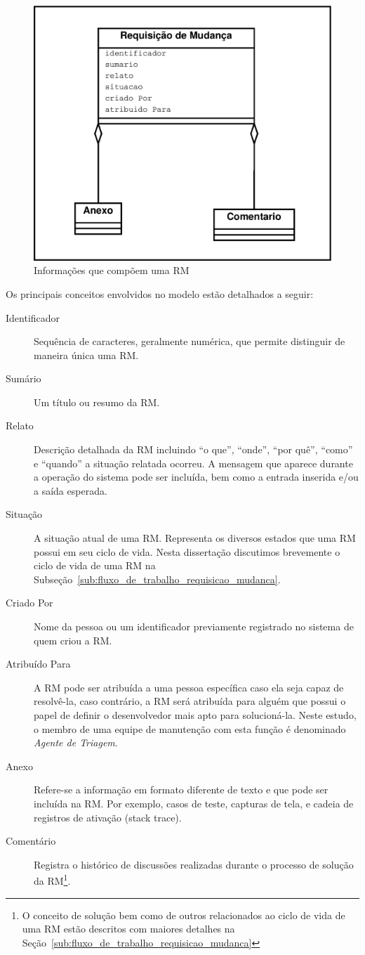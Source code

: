 \begin{figure}[htpb]
	\centering
	\includegraphics[width=0.5\linewidth]{./chapter-manutencao-software-visao-geral/img/diagrama-classe-atributos-requisicao-mudancas.pdf}
	\caption{Informações que compõem uma RM}
\label{fig:diagrama-classe-atributos-requisicao-mudancas}
\end{figure}

Os principais conceitos envolvidos no modelo estão detalhados a seguir:

\begin{description}
    \item [Identificador] Sequência de caracteres, geralmente numérica,  que
        permite distinguir de maneira única uma RM\@.
	\item [Sumário] Um título ou resumo da RM\@.
    \item [Relato] Descrição detalhada da RM incluindo ``o que'', ``onde'',
        ``por quê'', ``como'' e ``quando'' a situação relatada ocorreu. A
        mensagem que aparece durante a operação do sistema pode ser incluída,
        bem como a entrada inserida e/ou a saída esperada.
	\item [Situação] A situação atual de uma RM\@. Representa os diversos
		estados que uma RM possui em seu ciclo de vida. Nesta dissertação
		discutimos brevemente o ciclo de vida de uma RM na
		Subseção~\ref{sub:fluxo_de_trabalho_requisicao_mudanca}.
    \item [Criado Por] Nome da pessoa ou um identificador previamente registrado
        no sistema de quem criou a RM\@.
    \item [Atribuído Para] A RM pode ser atribuída a uma pessoa específica caso
        ela seja capaz de resolvê-la, caso contrário, a RM será atribuída para
        alguém que possui o papel de definir o desenvolvedor mais apto para
        solucioná-la. Neste estudo, o membro de uma equipe de manutenção com
        esta função é denominado \textit{Agente de Triagem}.
    \item [Anexo] Refere-se a informação em formato diferente de texto e que
        pode ser incluída na RM\@. Por exemplo, casos de teste, capturas de
        tela, e cadeia de registros de ativação (stack trace).
    \item [Comentário] Registra o histórico de discussões realizadas durante o
        processo de solução da RM\@\footnote{O conceito de solução bem como de
            outros relacionados ao ciclo de vida de uma RM estão descritos com
        maiores detalhes na Seção~\ref{sub:fluxo_de_trabalho_requisicao_mudanca}}.
\end{description}

